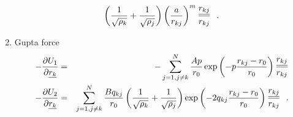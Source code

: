 \begin{enumerate}
\begin{eqnarray}
\left( {1 \over \sqrt{\rho_{k}}} + {1 \over \sqrt{\rho_{j}}} \right)
\left( \frac{a}{r_{kj}} \right)^{m} \frac{\mbox{$\underline{r_{kj}}$}}{r_{kj}}~~.
\end{eqnarray}
\item Gupta force
\begin{eqnarray}
-\frac{\partial U_{1}}{\partial \mbox{$\underline{r_{k}}$}} &=& -\sum_{j=1,j \ne k}^{N} \frac{A p}{r_{0}}
\exp \left( -p \frac{r_{kj}-r_{0}}{r_{0}} \right) \frac{\mbox{$\underline{r_{kj}}$}}{r_{kj}} \nonumber \\
-\frac{\partial U_{2}}{\partial \mbox{$\underline{r_{k}}$}} &=& \sum_{j=1,j \ne k}^{N} \frac{B q_{kj}}{r_{0}}
\left( {1 \over \sqrt{\rho_{k}}} + {1 \over \sqrt{\rho_{j}}} \right)
\exp \left( -2 q_{kj} \frac{r_{kj}-r_{0}}{r_{0}} \right) \frac{\mbox{$\underline{r_{kj}}$}}{r_{kj}}~~.
\end{eqnarray}
\end{enumerate}

